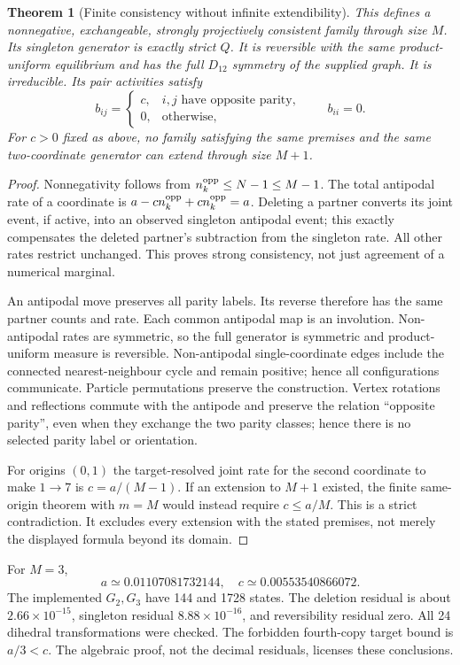 \documentclass[11pt,a4paper]{article}
\newtheorem{theorem}{Theorem}
\begin{document}
\begin{theorem}[Finite consistency without infinite extendibility]
This defines a nonnegative, exchangeable, strongly projectively consistent
family through size $M$. Its singleton generator is exactly strict $Q$.
It is reversible with the same product-uniform equilibrium and has the
full $D_{12}$ symmetry of the supplied graph. It is irreducible. Its pair
activities satisfy
\[
 b_{ij}=\begin{cases}c,&i,j\text{ have opposite parity},\\0,&\text{otherwise},\end{cases}
 \qquad b_{ii}=0.
\]
For $c>0$ fixed as above, no family satisfying the same premises and the
same two-coordinate generator can extend through size $M+1$.
\end{theorem}
\begin{proof}
Nonnegativity follows from $n_k^{\rm opp}\le N-1\le M-1$.
The total antipodal rate of a coordinate is
$a-c n_k^{\rm opp}+c n_k^{\rm opp}=a$. Deleting a partner converts its
joint event, if active, into an observed singleton antipodal event; this
exactly compensates the deleted partner's subtraction from the singleton
rate. All other rates restrict unchanged. This proves strong consistency,
not just agreement of a numerical marginal.

An antipodal move preserves all parity labels. Its reverse therefore has
the same partner counts and rate. Each common antipodal map is an
involution. Non-antipodal rates are symmetric, so the full generator is
symmetric and product-uniform measure is reversible. Non-antipodal
single-coordinate edges include the connected nearest-neighbour cycle and
remain positive; hence all configurations communicate. Particle permutations
preserve the construction. Vertex rotations and reflections commute with
the antipode and preserve the relation ``opposite parity'', even when they
exchange the two parity classes; hence there is no selected parity label or
orientation.

For origins $(0,1)$ the target-resolved joint rate for the second coordinate
to make $1\to7$ is $c=a/(M-1)$. If an extension to $M+1$ existed, the
finite same-origin theorem with $m=M$ would instead require $c\le a/M$.
This is a strict contradiction. It excludes every extension with the stated
premises, not merely the displayed formula beyond its domain.
\end{proof}

For $M=3$,
\[
 a\simeq0.01107081732144,\quad c\simeq0.00553540866072.
\]
The implemented $G_2,G_3$ have 144 and 1728 states. The deletion residual
is about $2.66\times10^{-15}$, singleton residual $8.88\times10^{-16}$,
and reversibility residual zero. All 24 dihedral transformations were
checked. The forbidden fourth-copy target bound is $a/3<c$.
The algebraic proof, not the decimal residuals, licenses these conclusions.
\end{document}
